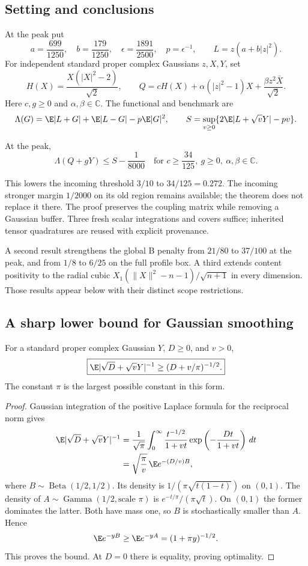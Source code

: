\subsection{Setting and conclusions}
At the peak put
\[
a=\frac{699}{1250},\quad b=\frac{179}{1250},\quad
\epsilon=\frac{1891}{2500},\quad p=\epsilon^{-1},\qquad
L=z(a+b|z|^2).
\]
For independent standard proper complex Gaussians \(z,X,Y\), set
\[
H(X)=\frac{X(|X|^2-2)}{\sqrt2},\qquad
Q=cH(X)+\alpha(|z|^2-1)X+\frac{\beta z^2\bar X}{\sqrt2}.
\]
Here \(c,g\ge0\) and \(\alpha,\beta\in\mathbb C\).
The functional and benchmark are
\[
\Lambda(G)=\E|L+G|+\E|L-G|-p\E|G|^2,\qquad
S=\sup_{v\ge0}\{2\E|L+\sqrt vY|-pv\}.
\]
\begin{theorem}
\label{thm:zero-bootstrap-halfline}
At the peak,
\[
\boxed{\Lambda(Q+gY)\le S-\frac1{8000}
\quad\text{for }c\ge\frac{34}{125},\ g\ge0,\
\alpha,\beta\in\mathbb C.}
\]
\end{theorem}
This lowers the incoming threshold \(3/10\) to \(34/125=0.272\).
The incoming stronger margin \(1/2000\) on its old region remains
available; the theorem does not replace it there.
The proof preserves the coupling matrix while removing a Gaussian
buffer.  Three fresh scalar integrations and covers suffice; inherited
tensor quadratures are reused with explicit provenance.

A second result strengthens the global B penalty from \(21/80\) to
\(37/100\) at the peak, and from \(1/8\) to \(6/25\) on the full profile
box.  A third extends content positivity to the radial cubic
\(X_1(\|X\|^2-n-1)/\sqrt{n+1}\) in every dimension.
Those results appear below with their distinct scope restrictions.

\subsection{A sharp lower bound for Gaussian smoothing}
\begin{lemma}
\label{lem:inverse-rice-pi}
For a standard proper complex Gaussian \(Y\), \(D\ge0\), and \(v>0\),
\[
\boxed{\E|\sqrt D+\sqrt vY|^{-1}
\ge(D+v/\pi)^{-1/2}.}
\]
The constant \(\pi\) is the largest possible constant in this form.
\end{lemma}
\begin{proof}
Gaussian integration of the positive Laplace formula for the reciprocal
norm gives
\[
\begin{aligned}
\E|\sqrt D+\sqrt vY|^{-1}
&=\frac1{\sqrt\pi}\int_0^\infty
\frac{t^{-1/2}}{1+vt}
\exp\left(-\frac{Dt}{1+vt}\right)\,dt\\
&=\sqrt{\frac\pi v}\,\E e^{-(D/v)B},
\end{aligned}
\]
where \(B\sim\operatorname{Beta}(1/2,1/2)\).
Its density is \(1/(\pi\sqrt{t(1-t)})\) on \((0,1)\).
The density of \(A\sim\operatorname{Gamma}(1/2,\text{scale }\pi)\)
is \(e^{-t/\pi}/(\pi\sqrt t)\).  On \((0,1)\) the former dominates
the latter.  Both have mass one, so \(B\) is stochastically smaller
than \(A\).  Hence
\[
\E e^{-yB}\ge\E e^{-yA}=(1+\pi y)^{-1/2}.
\]
This proves the bound.  At \(D=0\) there is equality, proving optimality.
\end{proof}

